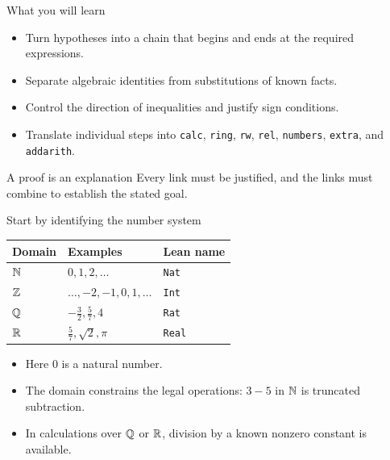 


\begin{frame}\titlepage\end{frame}

\begin{frame}{What you will learn}
\begin{itemize}
\item Turn hypotheses into a chain that begins and ends at the required expressions.
\item Separate algebraic identities from substitutions of known facts.
\item Control the direction of inequalities and justify sign conditions.
\item Translate individual steps into \texttt{calc}, \texttt{ring}, \texttt{rw},
      \texttt{rel}, \texttt{numbers}, \texttt{extra}, and \texttt{addarith}.
\end{itemize}
\begin{block}{A proof is an explanation}
Every link must be justified, and the links must combine to establish the stated goal.
\end{block}
\end{frame}

\begin{frame}{Start by identifying the number system}
\begin{center}
\begin{tabular}{lll}
\toprule
Domain & Examples & Lean name \\
\midrule
$\mathbb{N}$ & $0,1,2,\ldots$ & \texttt{Nat} \\
$\mathbb{Z}$ & $\ldots,-2,-1,0,1,\ldots$ & \texttt{Int} \\
$\mathbb{Q}$ & $-\frac32,\frac57,4$ & \texttt{Rat} \\
$\mathbb{R}$ & $\frac57,\sqrt2,\pi$ & \texttt{Real} \\
\bottomrule
\end{tabular}
\end{center}
\begin{itemize}
\item Here $0$ is a natural number.
\item The domain constrains the legal operations: $3-5$ in $\mathbb{N}$ is truncated subtraction.
\item In calculations over $\mathbb{Q}$ or $\mathbb{R}$, division by a known nonzero constant is available.
\end{itemize}
\end{frame}

